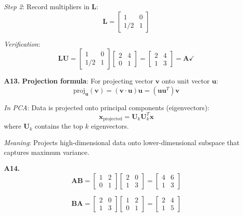 \documentclass[12pt,a4paper]{article}
\theoremstyle{definition}
\begin{document}
\textit{Step 2}: Record multipliers in $\mathbf{L}$:
\[
\mathbf{L} = \begin{bmatrix} 1 & 0 \\ 1/2 & 1 \end{bmatrix}
\]

\textit{Verification}:
\[
\mathbf{LU} = \begin{bmatrix} 1 & 0 \\ 1/2 & 1 \end{bmatrix} \begin{bmatrix} 2 & 4 \\ 0 & 1 \end{bmatrix} = \begin{bmatrix} 2 & 4 \\ 1 & 3 \end{bmatrix} = \mathbf{A} \checkmark
\]

\textbf{A13.} \textbf{Projection formula}: For projecting vector $\mathbf{v}$ onto unit vector $\mathbf{u}$:
\[
\text{proj}_{\mathbf{u}}(\mathbf{v}) = (\mathbf{v} \cdot \mathbf{u})\mathbf{u} = (\mathbf{u}\mathbf{u}^T)\mathbf{v}
\]

\textit{In PCA}: Data is projected onto principal components (eigenvectors):
\[
\mathbf{x}_{\text{projected}} = \mathbf{U}_k\mathbf{U}_k^T\mathbf{x}
\]
where $\mathbf{U}_k$ contains the top $k$ eigenvectors.

\textit{Meaning}: Projects high-dimensional data onto lower-dimensional subspace that captures maximum variance.

\textbf{A14.}
\[
\mathbf{AB} = \begin{bmatrix} 1 & 2 \\ 0 & 1 \end{bmatrix} \begin{bmatrix} 2 & 0 \\ 1 & 3 \end{bmatrix} = \begin{bmatrix} 4 & 6 \\ 1 & 3 \end{bmatrix}
\]

\[
\mathbf{BA} = \begin{bmatrix} 2 & 0 \\ 1 & 3 \end{bmatrix} \begin{bmatrix} 1 & 2 \\ 0 & 1 \end{bmatrix} = \begin{bmatrix} 2 & 4 \\ 1 & 5 \end{bmatrix}
\]
\end{document}
